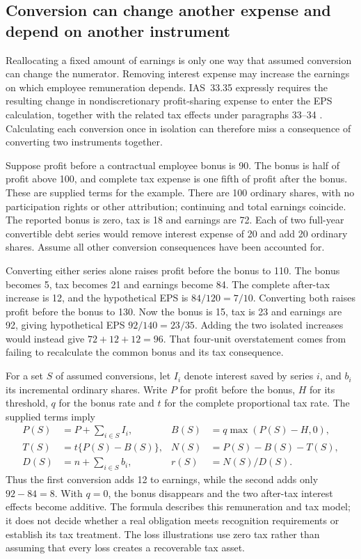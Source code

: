 \subsection{Conversion can change another expense and depend on another instrument}
\label{dependent-eps-consequences}

Reallocating a fixed amount of earnings is only one way that assumed conversion
can change the numerator. Removing interest expense may increase the earnings
on which employee remuneration depends. IAS~33.35 expressly requires the
resulting change in nondiscretionary profit-sharing expense to enter the EPS
calculation, together with the related tax effects under paragraphs 33--34
\citep[IAS~33.33--35]{eu20231803}. Calculating each conversion once in isolation
can therefore miss a consequence of converting two instruments together.

Suppose profit before a contractual employee bonus is 90. The bonus is half of
profit above 100, and complete tax expense is one fifth of profit after the
bonus. These are supplied terms for the example. There are 100 ordinary shares,
with no participation rights or other attribution; continuing and total
earnings coincide. The reported bonus is zero, tax is 18 and earnings are 72.
Each of two full-year convertible debt series would remove interest expense of
20 and add 20 ordinary shares. Assume all other conversion consequences have
been accounted for.

Converting either series alone raises profit before the bonus to 110. The bonus
becomes 5, tax becomes 21 and earnings become 84. The complete after-tax increase
is 12, and the hypothetical EPS is \(84/120=7/10\). Converting both raises
profit before the bonus to 130. Now the bonus is 15, tax is 23 and earnings
are 92, giving hypothetical EPS \(92/140=23/35\). Adding the two isolated
increases would instead give \(72+12+12=96\). That four-unit overstatement
comes from failing to recalculate the common bonus and its tax consequence.

For a set \(S\) of assumed conversions, let \(I_i\) denote interest saved by
series \(i\), and \(b_i\) its incremental ordinary shares. Write \(P\) for
profit before the bonus, \(H\) for its threshold, \(q\) for the bonus rate
and \(t\) for the complete proportional tax rate. The supplied terms imply
\[
 \begin{aligned}
 P(S)&=P+\sum_{i\in S}I_i,&
 B(S)&=q\max(P(S)-H,0),\\
 T(S)&=t\{P(S)-B(S)\},&
 N(S)&=P(S)-B(S)-T(S),\\
 D(S)&=n+\sum_{i\in S}b_i,&
 r(S)&=N(S)/D(S).
 \end{aligned}
\]
Thus the first conversion adds 12 to earnings, while the second adds only
\(92-84=8\). With \(q=0\), the bonus disappears and the two after-tax
interest effects become additive. The formula describes this remuneration and
tax model; it does not decide whether a real obligation meets recognition
requirements or establish its tax treatment. The loss illustrations use zero
tax rather than assuming that every loss creates a recoverable tax asset.

